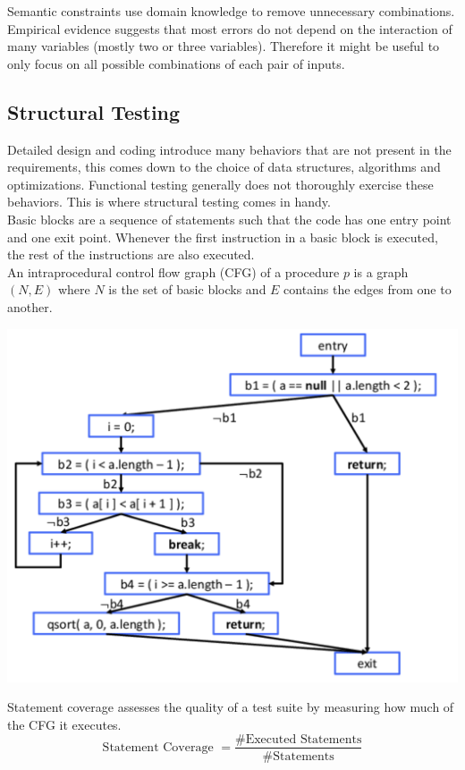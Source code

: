 Semantic constraints use domain knowledge to remove unnecessary combinations. \\

Empirical evidence suggests that most errors do not depend on the interaction of many variables (mostly two or three variables). Therefore it might be useful to only focus on all possible combinations of each pair of inputs.


\subsection{Structural Testing}

Detailed design and coding introduce many behaviors that are not present in the requirements, this comes down to the choice of data structures, algorithms and optimizations. Functional testing generally does not thoroughly exercise these behaviors. This is where structural testing comes in handy. \\

Basic blocks are a sequence of statements such that the code has one entry point and one exit point. Whenever the first instruction in a basic block is executed, the rest of the instructions are also executed. \\

An intraprocedural control flow graph (CFG) of a procedure $p$ is a graph $(N,E)$ where $N$ is the set of basic blocks and $E$ contains the edges from one to another.

\begin{center}
	\includegraphics[width=0.8\columnwidth]{assets/cfg}
\end{center}

Statement coverage assesses the quality of a test suite by measuring how much of the CFG it executes.
$$\text{Statement Coverage } = \frac{\text{\#Executed Statements}}{\text{\#Statements}}$$

